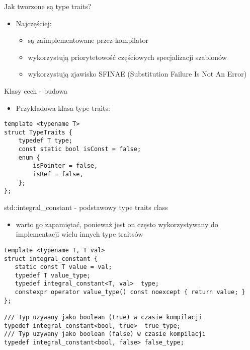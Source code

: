 \documentclass[11pt]{beamer}
\begin{document}
\begin{frame}[fragile]{Jak tworzone są type traits?}
  \begin{itemize}
 \item Najczęściej:
 \begin{itemize}
 
 \item są zaimplementowane przez kompilator
  \item wykorzystują priorytetowość częściowych specjalizacji szablonów
  \item wykorzystują zjawisko SFINAE (Substitution Failure Is Not An Error)
 \end{itemize}
 \end{itemize}
\end{frame}

\begin{frame}[fragile]{Klasy cech - budowa}
    \begin{itemize}
     \item Przykładowa klasa type traits:
    \end{itemize}
    \begin{lstlisting}[frame=single]
template <typename T>
struct TypeTraits {
    typedef T type;
    const static bool isConst = false;
    enum {
        isPointer = false,
        isRef = false,
    };
};
    \end{lstlisting}
\end{frame}

\begin{frame}[fragile]{std::integral\_constant - podstawowy type traits class}
    \begin{itemize}
     \item warto go zapamiętać, ponieważ jest on często wykorzystywany do implementacji wielu innych type traitsów
    \end{itemize}
    \begin{lstlisting}[frame=single]
template <typename T, T val>
struct integral_constant {
   static const T value = val;
   typedef T value_type;
   typedef integral_constant<T, val>  type;
   constexpr operator value_type() const noexcept { return value; }
};

/// Typ uzywany jako boolean (true) w czasie kompilacji
typedef integral_constant<bool, true>  true_type;
/// Typ uzywany jako boolean (false) w czasie kompilacji
typedef integral_constant<bool, false> false_type;

    \end{lstlisting}
\end{frame}
\end{document}
